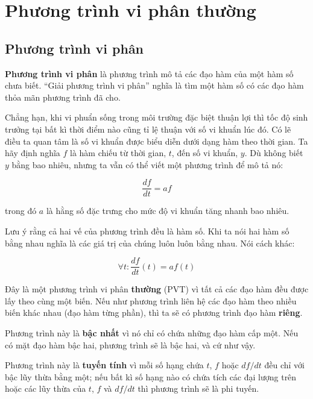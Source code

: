 \documentclass[12pt]{book}
\begin{document}



\chapter{Phương trình vi phân thường}


\section{Phương trình vi phân}

{\bf Phương trình vi phân} là phương trình mô tả các đạo hàm của
một hàm số chưa biết. ``Giải phương trình vi phân'' nghĩa là tìm
một hàm số có các đạo hàm thỏa mãn phương trình đã cho.

Chẳng hạn, khi vi phuẩn sống trong môi trường đặc biệt thuận
lợi thì tốc độ sinh trưởng tại bất kì thời điểm nào cũng tỉ lệ thuận
với số vi khuẩn lúc đó. Có lẽ điều ta quan tâm là số vi khuẩn được
biểu diễn dưới dạng hàm theo thời gian. Ta hãy định nghĩa 
$f$ là hàm chiếu từ thời gian, $t$, đến số vi khuẩn, $y$.  Dù không
biết $y$ bằng bao nhiêu, nhưng ta vẫn có thể viết một phương trình 
để mô tả nó:

\[ \frac{df}{dt} = a f \]

\noindent trong đó $a$ là hằng số đặc trưng cho mức độ vi khuẩn tăng 
nhanh bao nhiêu.

Lưu ý rằng cả hai vế của phương trình đều là hàm số. Khi ta nói
hai hàm số bằng nhau nghĩa là các giá trị của chúng luôn luôn
bằng nhau. Nói cách khác:

\[ \forall t: \frac{df}{dt}(t) = a f(t) \]

Đây là một phương trình vi phân {\bf thường} (PVT) vì tất cả các
đạo hàm đều được lấy theo cùng một biến. Nếu như phương trình
liên hệ các đạo hàm theo nhiều biến khác nhau (đạo hàm từng
phần), thì ta sẽ có phương trình đạo hàm {\bf riêng}.

Phương trình này là {\bf bậc nhất} vì nó chỉ có chứa những đạo hàm
cấp một. Nếu có mặt đạo hàm bậc hai, phương trình sẽ là bậc hai, 
và cứ như vậy.

Phương trình này là {\bf tuyến tính} vì mỗi số hạng chứa $t$, $f$ hoặc
$df/dt$ đều chỉ với bậc lũy thừa bằng một; nếu bất kì số hạng nào
có chứa tích các đại lượng trên hoặc các lũy thừa của $t$, $f$ và 
$df/dt$ thì phương trình sẽ là phi tuyến.
\end{document}
